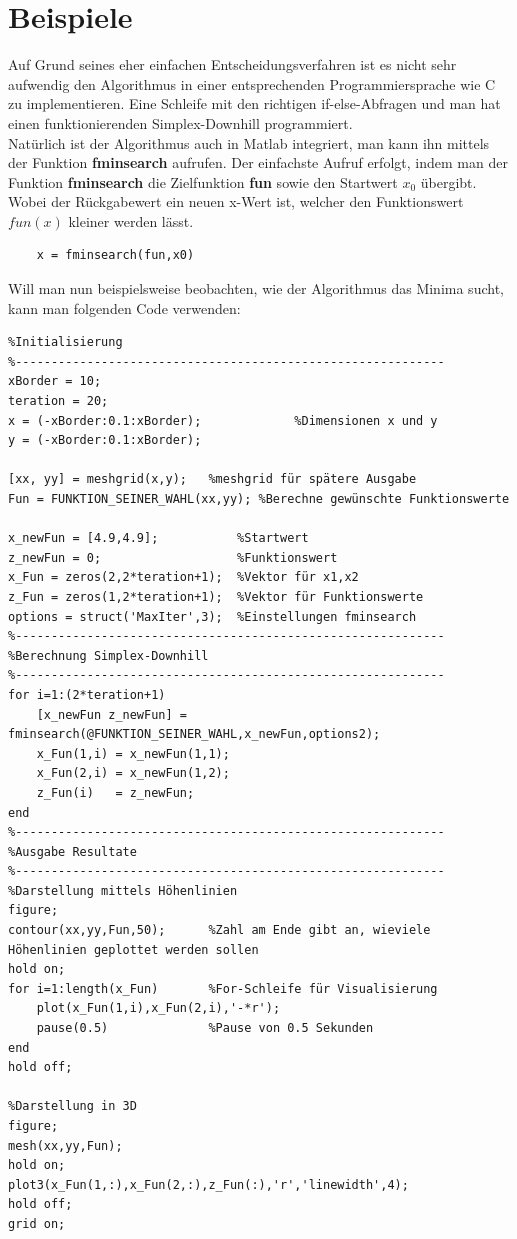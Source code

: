 \section{Beispiele}
Auf Grund seines eher einfachen Entscheidungsverfahren ist es nicht sehr aufwendig den Algorithmus in einer entsprechenden Programmiersprache wie C zu implementieren. Eine Schleife mit den richtigen if-else-Abfragen und man hat einen funktionierenden Simplex-Downhill programmiert.\\
Natürlich ist der Algorithmus auch in Matlab integriert, man kann ihn mittels der Funktion \textbf{fminsearch} aufrufen. 
Der einfachste Aufruf erfolgt, indem man der Funktion \textbf{fminsearch} die Zielfunktion \textbf{fun} sowie den Startwert \textbf{$x_0$} übergibt. Wobei der Rückgabewert ein neuen x-Wert ist, welcher den Funktionswert $fun(x)$ kleiner werden lässt. 
\begin{lstlisting}
	x = fminsearch(fun,x0)
\end{lstlisting} 
Will man nun beispielsweise beobachten, wie der Algorithmus das Minima sucht, kann man folgenden Code verwenden: 
\begin{lstlisting}[style=Matlab]
%------------------------------------------------------------
%Initialisierung
%------------------------------------------------------------
xBorder = 10; 
teration = 20; 
x = (-xBorder:0.1:xBorder);				%Dimensionen x und y
y = (-xBorder:0.1:xBorder); 

[xx, yy] = meshgrid(x,y);	%meshgrid für spätere Ausgabe
Fun = FUNKTION_SEINER_WAHL(xx,yy); %Berechne gewünschte Funktionswerte

x_newFun = [4.9,4.9];			%Startwert
z_newFun = 0; 					%Funktionswert
x_Fun = zeros(2,2*teration+1); 	%Vektor für x1,x2
z_Fun = zeros(1,2*teration+1);	%Vektor für Funktionswerte
options = struct('MaxIter',3);	%Einstellungen fminsearch
%------------------------------------------------------------
%Berechnung Simplex-Downhill
%------------------------------------------------------------
for i=1:(2*teration+1)
	[x_newFun z_newFun] = fminsearch(@FUNKTION_SEINER_WAHL,x_newFun,options2);
	x_Fun(1,i) = x_newFun(1,1);
	x_Fun(2,i) = x_newFun(1,2); 
	z_Fun(i)   = z_newFun; 
end
%------------------------------------------------------------
%Ausgabe Resultate
%------------------------------------------------------------
%Darstellung mittels Höhenlinien
figure; 
contour(xx,yy,Fun,50); 		%Zahl am Ende gibt an, wieviele Höhenlinien geplottet werden sollen
hold on; 
for i=1:length(x_Fun)		%For-Schleife für Visualisierung
    plot(x_Fun(1,i),x_Fun(2,i),'-*r'); 
    pause(0.5)				%Pause von 0.5 Sekunden
end
hold off; 

%Darstellung in 3D
figure; 
mesh(xx,yy,Fun);
hold on; 
plot3(x_Fun(1,:),x_Fun(2,:),z_Fun(:),'r','linewidth',4); 
hold off; 
grid on; 
\end{lstlisting}
